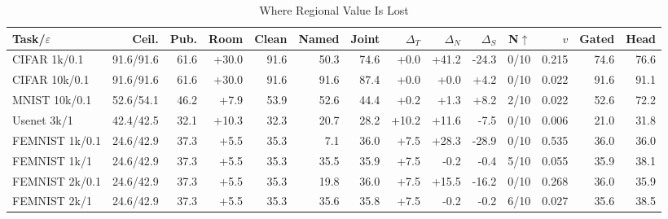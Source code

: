 \begin{table}[t]
\caption{Where Regional Value Is Lost}
\label{tab:decomposition}\small\setlength{\tabcolsep}{3.2pt}
\centering
\begin{tabular}{@{}lrrrrrrrrrrrrr@{}}\toprule
Task/$\varepsilon$ & Ceil. & Pub. & Room & Clean & Named & Joint & $\Delta_T$ & $\Delta_N$ & $\Delta_S$ & N$\uparrow$ & $v$ & Gated & Head \\
\midrule
CIFAR 1k/0.1 & 91.6/91.6 & 61.6 & +30.0 & 91.6 & 50.3 & 74.6 & +0.0 & +41.2 & -24.3 & 0/10 & 0.215 & 74.6 & 76.6 \\
CIFAR 10k/0.1 & 91.6/91.6 & 61.6 & +30.0 & 91.6 & 91.6 & 87.4 & +0.0 & +0.0 & +4.2 & 0/10 & 0.022 & 91.6 & 91.1 \\
MNIST 10k/0.1 & 52.6/54.1 & 46.2 & +7.9 & 53.9 & 52.6 & 44.4 & +0.2 & +1.3 & +8.2 & 2/10 & 0.022 & 52.6 & 72.2 \\
Usenet 3k/1 & 42.4/42.5 & 32.1 & +10.3 & 32.3 & 20.7 & 28.2 & +10.2 & +11.6 & -7.5 & 0/10 & 0.006 & 21.0 & 31.8 \\
FEMNIST 1k/0.1 & 24.6/42.9 & 37.3 & +5.5 & 35.3 & 7.1 & 36.0 & +7.5 & +28.3 & -28.9 & 0/10 & 0.535 & 36.0 & 36.0 \\
FEMNIST 1k/1 & 24.6/42.9 & 37.3 & +5.5 & 35.3 & 35.5 & 35.9 & +7.5 & -0.2 & -0.4 & 5/10 & 0.055 & 35.9 & 38.1 \\
FEMNIST 2k/0.1 & 24.6/42.9 & 37.3 & +5.5 & 35.3 & 19.8 & 36.0 & +7.5 & +15.5 & -16.2 & 0/10 & 0.268 & 36.0 & 35.9 \\
FEMNIST 2k/1 & 24.6/42.9 & 37.3 & +5.5 & 35.3 & 35.6 & 35.8 & +7.5 & -0.2 & -0.2 & 6/10 & 0.027 & 35.6 & 38.5 \\
\bottomrule\end{tabular}
\end{table}
